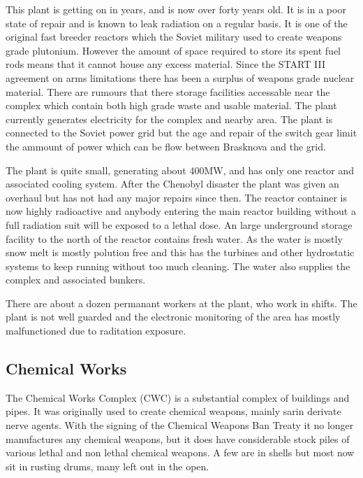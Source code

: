 \documentclass{amsart}
\begin{document}
\begin{multicols}{3}
This plant is getting on in years, and is now over forty years old.
It is in a poor state of repair and is known to leak radiation on a
regular basis.  It is one of the original fast breeder reactors which
the Soviet military used to create weapons grade plutonium.  However
the amount of space required to store its spent fuel rods means that
it cannot house any excess material.  Since the START III agreement on
arms limitations there has been a surplus of weapons grade nuclear
material.  There are rumours that there storage facilities accessable
near the complex which contain both high grade waste and usable
material.  The plant currently generates electricity for the complex
and nearby area.  The plant is connected to the Soviet power grid but
the age and repair of the switch gear limit the ammount of power which
can be flow between Brasknova and the grid.

The plant is quite small, generating about 400MW, and has only one
reactor and associated cooling system.  After the Chenobyl disaster
the plant was given an overhaul but has not had any major repairs
since then.  The reactor container is now highly radioactive and
anybody entering the main reactor building without a full radiation
suit will be exposed to a lethal dose.  An large underground storage
facility to the north of the reactor contains fresh water.  As the
water is mostly snow melt is mostly polution free and this has the
turbines and other hydrostatic systems to keep running without too
much cleaning.  The water also supplies the complex and associated
bunkers.

There are about a dozen permanant workers at the plant, who work in
shifts.  The plant is not well guarded and the electronic monitoring
of the area has mostly malfunctioned due to raditation exposure.

\subsection{Chemical Works}

The Chemical Works Complex (CWC) is a substantial complex of buildings
and pipes.  It was originally used to create chemical weapons, mainly
sarin derivate nerve agents.  With the signing of the Chemical Weapons
Ban Treaty it no longer manufactures any chemical weapons, but it does
have considerable stock piles of various lethal and non lethal
chemical weapons.  A few are in shells but most now sit in rusting
drums, many left out in the open.


\end{multicols}
\end{document}
